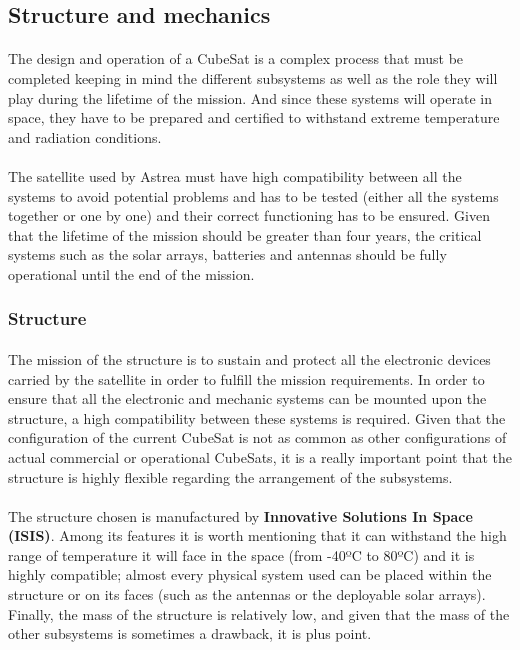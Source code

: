\subsection{Structure and mechanics}

\paragraph{}The design and operation of a CubeSat is a complex process that must be completed keeping in mind the different subsystems as well as the role they will play during the lifetime of the mission. And since these systems will operate in space, they have to be prepared and certified to withstand extreme temperature and radiation conditions.

\paragraph{}The satellite used by Astrea must have high compatibility between all the systems to avoid potential problems and has to be tested (either all the systems together or one by one) and their correct functioning has to be ensured. Given that the lifetime of the mission should be greater than four years, the critical systems such as the solar arrays, batteries and antennas should be fully operational until the end of the mission.

\subsubsection{Structure}

\paragraph{}The mission of the structure is to sustain and protect all the electronic devices carried by the satellite in order to fulfill the mission requirements. In order to ensure that all the electronic and mechanic systems can be mounted upon the structure, a high compatibility between these systems is required. Given that the configuration of the current CubeSat is not as common as other configurations of actual commercial or operational CubeSats, it is a really important point that the structure is highly flexible regarding the arrangement of the subsystems.

\paragraph{}The structure chosen is manufactured by \textbf{Innovative Solutions In Space (ISIS)}. Among its features it is worth mentioning that it can withstand the high range of temperature it will face in the space (from -40ºC to 80ºC) and it is highly compatible; almost every physical system  used can be placed within the structure or on its faces (such as the antennas or the deployable solar arrays). Finally, the mass of the structure is relatively low, and given that the mass of the other subsystems is sometimes a drawback, it is plus point.

